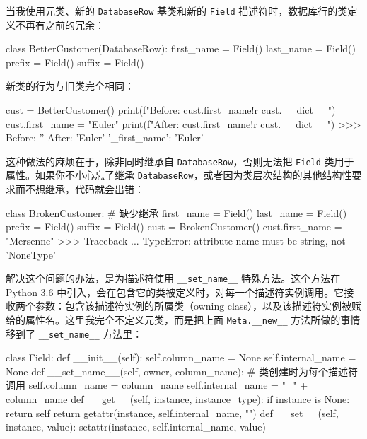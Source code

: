 当我使用元类、新的 \texttt{DatabaseRow} 基类和新的 \texttt{Field} 描述符时，数据库行的类定义不再有之前的冗余：

\begin{codebox}[python]
class BetterCustomer(DatabaseRow):
    first_name = Field()
    last_name = Field()
    prefix = Field()
    suffix = Field()
\end{codebox}

新类的行为与旧类完全相同：

\begin{codebox}[python]
cust = BetterCustomer()
print(f"Before: {cust.first_name!r} {cust.__dict__}")
cust.first_name = "Euler"
print(f"After:  {cust.first_name!r} {cust.__dict__}")
>>>
Before: '' {}
After:  'Euler' {'_first_name': 'Euler'}
\end{codebox}

这种做法的麻烦在于，除非同时继承自 \texttt{DatabaseRow}，否则无法把 \texttt{Field} 类用于属性。如果你不小心忘了继承 \texttt{DatabaseRow}，或者因为类层次结构的其他结构性要求而不想继承，代码就会出错：

\begin{codebox}[python]
class BrokenCustomer:  # 缺少继承
    first_name = Field()
    last_name = Field()
    prefix = Field()
    suffix = Field()
cust = BrokenCustomer()
cust.first_name = "Mersenne"
>>>
Traceback ...
TypeError: attribute name must be string, not 'NoneType'
\end{codebox}

解决这个问题的办法，是为描述符使用 \texttt{\_\_set\_name\_\_} 特殊方法。这个方法在 Python 3.6 中引入，会在包含它的类被定义时，对每一个描述符实例调用。它接收两个参数：包含该描述符实例的所属类（owning class），以及该描述符实例被赋给的属性名。这里我完全不定义元类，而是把上面 \texttt{Meta.\_\_new\_\_} 方法所做的事情移到了 \texttt{\_\_set\_name\_\_} 方法里：

\begin{codebox}[python]
class Field:
    def __init__(self):
        self.column_name = None
        self.internal_name = None
    def __set_name__(self, owner, column_name):
        # 类创建时为每个描述符调用
        self.column_name = column_name
        self.internal_name = "_" + column_name
    def __get__(self, instance, instance_type):
        if instance is None:
            return self
        return getattr(instance, self.internal_name, "")
    def __set__(self, instance, value):
        setattr(instance, self.internal_name, value)
\end{codebox}

